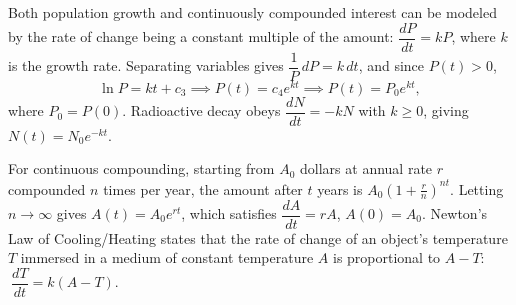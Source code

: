 \documentclass[10pt]{article}
\begin{document}
Both population growth and continuously compounded interest can be modeled by the rate of
change being a constant multiple of the amount: \(\dfrac{dP}{dt} = kP\), where \(k\) is the
growth rate. Separating variables gives \(\dfrac{1}{P}\,dP = k\,dt\), and since \(P(t) > 0\),
\[
    \ln P = kt + c_3 \implies P(t) = c_4 e^{kt} \implies P(t) = P_0 e^{kt},
\]
where \(P_0 = P(0)\). Radioactive decay obeys \(\dfrac{dN}{dt} = -kN\) with \(k \geq 0\), giving
\(N(t) = N_0 e^{-kt}\).

\begin{note}
    For continuous compounding, starting from \(A_0\) dollars at annual rate \(r\) compounded
    \(n\) times per year, the amount after \(t\) years is \(A_0\left(1 + \tfrac{r}{n}\right)^{nt}\).
    Letting \(n \to \infty\) gives \(A(t) = A_0 e^{rt}\), which satisfies \(\dfrac{dA}{dt} = rA\),
    \(A(0) = A_0\). Newton's Law of Cooling/Heating states that the rate of change of an object's
    temperature \(T\) immersed in a medium of constant temperature \(A\) is proportional to
    \(A - T\): \(\ \dfrac{dT}{dt} = k(A - T)\).
\end{note}
\end{document}
